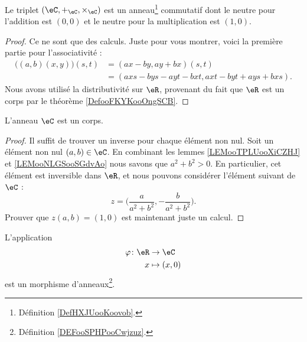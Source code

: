 \begin{lemma}
	Le triplet \( (\eC,+_{\eC}, \times_{\eC})\) est un anneau\footnote{Définition \ref{DefHXJUooKoovob}.} commutatif dont le neutre pour l'addition est \( (0,0)\) et le neutre pour la multiplication est \( (1,0)\).
\end{lemma}

\begin{proof}
	Ce ne sont que des calculs. Juste pour vous montrer, voici la première partie pour l'associativité :
	\begin{subequations}
		\begin{align}
			\big( (a,b)(x,y) \big)(s,t) & =(ax-by,ay+bx)(s,t)                 \\
			                            & =(axs-bys-ayt-bxt,axt-byt+ays+bxs).
		\end{align}
	\end{subequations}
	Nous avons utilisé la distributivité sur \( \eR\), provenant du fait que \( \eR\) est un corps par le théorème \ref{DefooFKYKooOngSCB}.
\end{proof}

\begin{lemma}
	L'anneau \( \eC\) est un corps.
\end{lemma}

\begin{proof}
	Il suffit de trouver un inverse pour chaque élément non nul. Soit un élément non nul \( (a,b)\in \eC\). En combinant les lemmes \ref{LEMooTPLUooXiCZHJ} et \ref{LEMooNLGSooSGdvAo} nous savons que \( a^2+b^2>0\). En particulier, cet élément est inversible dans \( \eR\), et nous pouvons considérer l'élément suivant de \( \eC\) :
	\begin{equation}
		z=\big( \frac{ a }{ a^2+b^2 }, -\frac{ b }{ a^2+b^2 } \big).
	\end{equation}
	Prouver que \( z(a,b)=(1,0)\) est maintenant juste un calcul.
\end{proof}

\begin{lemma}
	L'application
	\begin{equation}
		\begin{aligned}
			\varphi\colon \eR & \to \eC       \\
			x                 & \mapsto (x,0)
		\end{aligned}
	\end{equation}
	est un morphisme d'anneaux\footnote{Définition \ref{DEFooSPHPooCwjzuz}.}.
\end{lemma}

